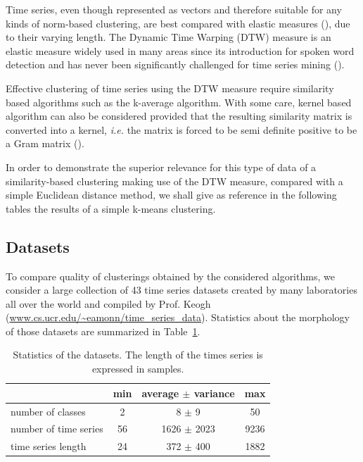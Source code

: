 \documentclass[a4paper,twoside]{article}
\begin{document}
Time series, even though represented as vectors and therefore suitable for any kinds of norm-based clustering, are best compared with elastic measures (\cite{Ding:2008:QMT:1454159.1454226, Wang:2013:ECR:2429736.2429754}), due to their varying length. The Dynamic Time Warping (DTW) measure is an elastic measure widely used in many areas since its introduction for spoken word detection \cite{1163055} and has never been significantly challenged for time series mining (\cite{conf/kdd/BerndtC94, Rakthanmanon:2013:ABD:2513092.2500489}).

Effective clustering of time series using the DTW measure require similarity based algorithms such as the k-average algorithm. With some care, kernel based algorithm can also be considered provided that the resulting similarity matrix is converted into a kernel, \textit{i.e.} the matrix is forced to be semi definite positive to be a Gram matrix (\cite{Lanckriet:2004:LKM:1005332.1005334}).

In order to demonstrate the superior relevance for this type of data of a similarity-based clustering making use of the DTW measure, compared with a simple Euclidean distance method, we shall give as reference in the following tables the results of a simple k-means clustering.

\subsection{Datasets}

To compare quality of clusterings obtained by the considered algorithms, we consider a large collection of 43 time series datasets created by many laboratories all over the world and compiled by Prof. Keogh (\url{www.cs.ucr.edu/~eamonn/time_series_data}).  Statistics about the morphology of those datasets are summarized in Table~\ref{tab:dbs}.

\begin{table}
\center
\begin{tabular}{l|ccc}
& min & average $\pm$ variance & max \\
\hline
number of classes & 2 & 8 $\pm$ 9 & 50 \\
number of time series & 56 & 1626 $\pm$ 2023 & 9236 \\
time series length & 24 & 372 $\pm$ 400 & 1882 \\
\end{tabular}
\caption{\label{tab:dbs} Statistics of the datasets. The length of the times series is expressed in samples.}
\end{table}
\end{document}
